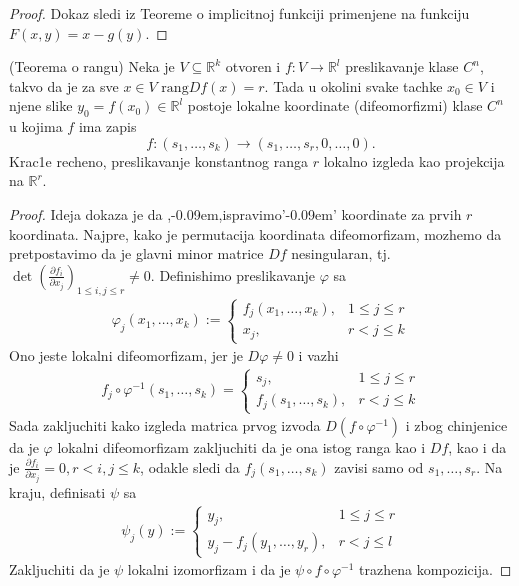 \documentclass[a4paper,12pt]{article}
\newcommand{\R}{\mathbb{R}}
\newcommand{\rang}{\mathrm{rang}}
\def\zn{,\kern-0.09em,} %
\def\zng{'\kern-0.09em' } %
\begin{document}
\begin{proof}
Dokaz sledi iz Teoreme o implicitnoj funkciji primenjene na funkciju $F(x,y) = x - g(y)$.
\end{proof}
\begin{tma}(Teorema o rangu) Neka je $V \subseteq \R^k$ otvoren i $f: V \to \R^l$ preslikavanje klase $C^n$, takvo da je za sve $x \in V$ $\rang Df(x) = r$. Tada u okolini svake tachke $x_0 \in V$ i njene slike $y_0 = f(x_0) \in \R^l$ postoje lokalne koordinate (difeomorfizmi) klase $C^n$ u kojima $f$ ima zapis \[f: (s_1, \dots , s_k) \to (s_1, \dots, s_r, 0, \dots , 0).\]
Krac1e recheno, preslikavanje konstantnog ranga $r$ lokalno izgleda kao projekcija na $\R^r$.
\end{tma}
\begin{proof}
	Ideja dokaza je da \zn ispravimo\zng koordinate za prvih $r$ koordinata.
	Najpre, kako je permutacija koordinata difeomorfizam, mozhemo da pretpostavimo da je 
	glavni minor matrice $Df$ nesingularan, tj. $\det \left( \frac{\partial f_i}{\partial x_j}\right)_{1\leq i, j \leq r} \neq 0$.
	Definishimo preslikavanje $\varphi$ sa 
	\begin{align*}
		\varphi_j (x_1, \dotso, x_k):= 
		\begin{cases}
			f_j(x_1, \dotso, x_k), &1\leq j \leq r \\
			x_j, &r<j\leq k
		\end{cases}
	\end{align*}
	Ono jeste lokalni difeomorfizam, jer je $D\varphi \neq 0$ i vazhi 
	\begin{align*}
		f_j\circ \varphi^{-1}(s_1,\dotso, s_k) = 
		\begin{cases}
			s_j, &1 \leq j \leq r \\ 
			f_j(s_1, \dotso , s_k), &r < j \leq k
		\end{cases}
	\end{align*}
	Sada zakljuchiti kako izgleda matrica prvog izvoda $D(f\circ \varphi^{-1})$ i zbog chinjenice da je $\varphi$ lokalni
	difeomorfizam zakljuchiti da je ona istog ranga kao i $Df$, kao i da je $\frac{\partial f_i}{\partial x_j}= 0,r< i, j \leq k$,
	odakle sledi da $f_j(s_1, \dotso , s_k)$ zavisi samo od $s_1,\dotso, s_r$. Na kraju, definisati $\psi$ sa 
	\begin{align*}
		\psi_j (y):= 
		\begin{cases}
			y_j, &1\leq j \leq r \\
			y_j - f_j(y_1,\dotso, y_r), &r<j\leq l
		\end{cases}
	\end{align*}
	Zakljuchiti da je $\psi$ lokalni izomorfizam i da je $\psi\circ f\circ \varphi^{-1}$ trazhena kompozicija.

\end{proof}
\end{document}
